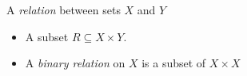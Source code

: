 A \emph{relation} between sets $X$ and $Y$

\begin{itemize}
    \item A subset $R \subseteq X \times Y$.
    \item A \emph{binary relation} on $X$ is a subset of $X \times X$
\end{itemize}

